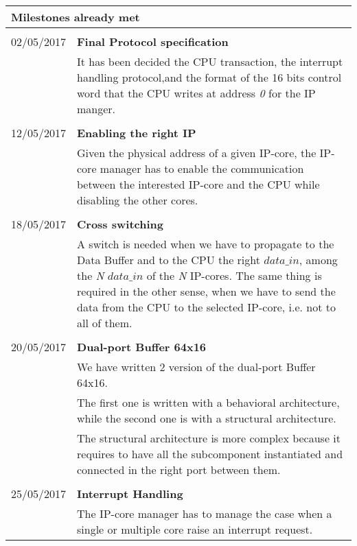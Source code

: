 \begin{table}[h]
	\begin{tabular}{p{2.1cm}|  p{13.5cm}}
\multicolumn{2}{p{10.0cm}}{ \LARGE{{ Milestones already met}}}\\
\hline \hline 
\multicolumn{2}{p{1.0cm}}{ \Large{{}}}\\
	02/05/2017 & \textbf{Final Protocol specification}\\
	&It has been decided the CPU transaction, the interrupt handling protocol,and the format of the 16 bits control word that the CPU writes at address \textit{0} for the IP manger. \\
	
	\multicolumn{2}{p{1.0cm}}{ \Large{{ }}}\\	
	12/05/2017 & \textbf{Enabling the right IP}	 \\
	&Given the physical address of a given IP-core, the IP-core manager has to enable the communication between the interested IP-core and the CPU while disabling the other cores.\\
		\multicolumn{2}{p{1.0cm}}{ \Large{{ }}}\\
		18/05/2017 & \textbf{Cross switching}\\
		& %
		A switch is needed when we have to propagate to the Data Buffer and to the CPU the right $ data\_in $, among the \textit{N}  $ data\_in $ of the \textit{N} IP-cores.
		The same thing is required in the other sense, when we have to send the data from the CPU to the selected IP-core, i.e. not to all of them.\\
		\multicolumn{2}{p{1.0cm}}{ \Large{{ }}}\\	
	20/05/2017 & \textbf{Dual-port Buffer 64x16}\\
	& We have written 2 version of the dual-port Buffer 64x16.\\
	& The first one is written with a behavioral architecture, while the second one is with a structural architecture.
	\\& The structural architecture is more complex because it requires to have all the subcomponent instantiated and connected in the right port between them.\\
	\multicolumn{2}{p{1.0cm}}{ \Large{{ }}}\\
		25/05/2017 & \textbf{Interrupt Handling}\\
		& The IP-core manager has to manage the case when a single or multiple core raise an interrupt request.\\

\end{tabular}
\end{table}
